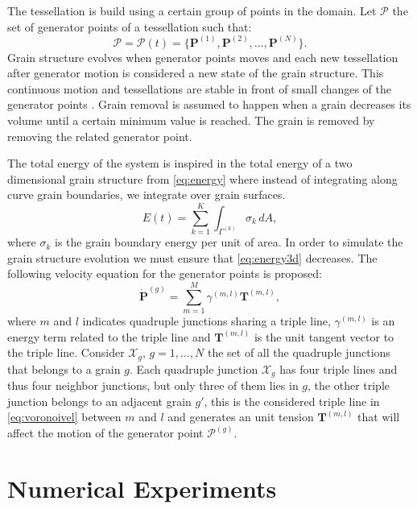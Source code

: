 The tessellation is build using a certain group of points in the domain. Let $\mathcal{P}$ the set of generator points of a tessellation such that:
\begin{equation*}
    \mathcal{P} = \mathcal{P}(t) = \{ \mathbf{P}^{(1)}, \mathbf{P}^{(2)}, \dotsc, \mathbf{P}^{(N)} \}.
\end{equation*}
Grain structure evolves when generator points moves and each new tessellation after generator motion is considered a new state of the grain structure. This continuous motion and tessellations are stable in front of small changes of the generator points \cite{reem2011geometric}. Grain removal is assumed to happen when a grain decreases its volume until a certain minimum value is reached. The grain is removed by removing the related generator point.


The total energy of the system is inspired in the total energy of a two dimensional grain structure from \eqref{eq:energy} where instead of integrating along curve grain boundaries, we integrate over grain surfaces.
\begin{equation}
    E(t) = \sum_{k=1}^{K} \int_{\Gamma^{(k)}} \sigma_k\,dA,
    \label{eq:energy3d}
\end{equation}
where $\sigma_k$ is the grain boundary energy per unit of area. In order to simulate the grain structure evolution we must ensure that \eqref{eq:energy3d} decreases. The following velocity equation for the generator points is proposed:
\begin{equation}
    \dot{\mathbf{P}}^{(g)} = \sum_{m=1}^{M} \gamma^{(m,l)}\mathbf{T}^{(m,l)},
    \label{eq:voronoivel}
\end{equation}
where $m$ and $l$ indicates quadruple junctions sharing a triple line, $\gamma^{(m,l)}$ is an energy term related to the triple line and $\mathbf{T}^{(m,l)}$ is the unit tangent vector to the triple line. Consider $\mathcal{X}_g,\, g = 1,\dotsc,N$ the set of all the quadruple junctions that belongs to a grain $g$. Each quadruple junction $\mathcal{X}_g$ has four triple lines and thus four neighbor junctions, but only three of them lies in $g$, the other triple junction belongs to an adjacent grain $g'$, this is the considered triple line in \eqref{eq:voronoivel} between $m$ and $l$ and generates an unit tension $\mathbf{T}^{(m,l)}$ that will affect the motion of the generator point $\mathcal{P}^{(g)}$.
\section{Numerical Experiments}

